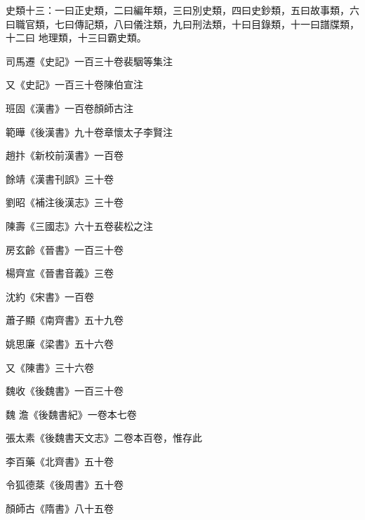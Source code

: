 
\begin{pinyinscope}

 史類十三：一曰正史類，二曰編年類，三曰別史類，四曰史鈔類，五曰故事類，六曰職官類，七曰傳記類，八曰儀注類，九曰刑法類，十曰目錄類，十一曰譜牒類，十二曰
 地理類，十三曰霸史類。



 司馬遷《史記》一百三十卷裴駰等集注



 又《史記》一百三十卷陳伯宣注



 班固《漢書》一百卷顏師古注



 範曄《後漢書》九十卷章懷太子李賢注



 趙抃《新校前漢書》一百卷



 餘靖《漢書刊誤》三十卷



 劉昭《補注後漢志》三十卷



 陳壽《三國志》六十五卷裴松之注



 房玄齡《晉書》一百三十卷



 楊齊宣《晉書音義》三卷



 沈約《宋書》一百卷



 蕭子顯《南齊書》五十九卷



 姚思廉《梁書》五十六卷



 又《陳書》三十六卷



 魏收《後魏書》一百三十卷



 魏
 澹《後魏書紀》一卷本七卷



 張太素《後魏書天文志》二卷本百卷，惟存此



 李百藥《北齊書》五十卷



 令狐德棻《後周書》五十卷



 顏師古《隋書》八十五卷




\end{pinyinscope}
